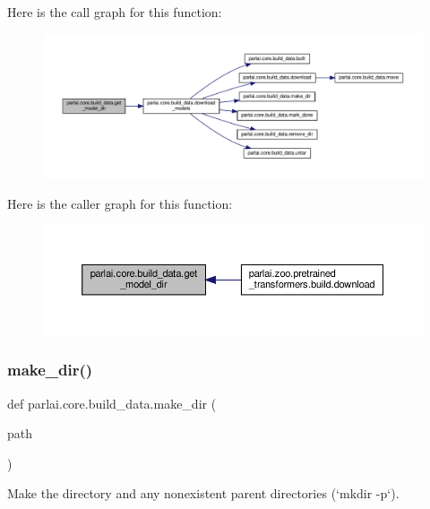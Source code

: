 Here is the call graph for this function\+:
\nopagebreak
\begin{figure}[H]
\begin{center}
\leavevmode
\includegraphics[width=350pt]{namespaceparlai_1_1core_1_1build__data_ad2fe6222094caae59f304931aee0952a_cgraph}
\end{center}
\end{figure}
Here is the caller graph for this function\+:
\nopagebreak
\begin{figure}[H]
\begin{center}
\leavevmode
\includegraphics[width=350pt]{namespaceparlai_1_1core_1_1build__data_ad2fe6222094caae59f304931aee0952a_icgraph}
\end{center}
\end{figure}
\mbox{\label{namespaceparlai_1_1core_1_1build__data_a6ce042fedd4194bd016845bbe7a8facf}} 
\subsubsection{\texorpdfstring{make\+\_\+dir()}{make\_dir()}}
{\footnotesize\ttfamily def parlai.\+core.\+build\+\_\+data.\+make\+\_\+dir (\begin{DoxyParamCaption}\item[{}]{path }\end{DoxyParamCaption})}

\begin{DoxyVerb}Make the directory and any nonexistent parent directories (`mkdir -p`).\end{DoxyVerb}
 


